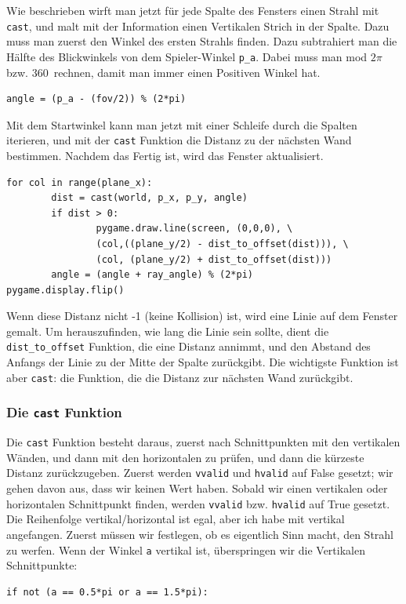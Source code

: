 \documentclass[a4paper,12pt]{report}
\begin{document}
Wie beschrieben wirft man jetzt für jede Spalte des Fensters einen Strahl mit \texttt{cast}, und malt mit der Information einen Vertikalen Strich in der Spalte. Dazu muss man zuerst den Winkel des ersten Strahls finden. Dazu subtrahiert man die Hälfte des Blickwinkels von dem Spieler-Winkel \texttt{p\_a}. Dabei muss man mod $2\pi$ bzw. 360\textdegree\ rechnen, damit man immer einen Positiven Winkel hat.
\begin{Verbatim}[baselinestretch=1.0, xleftmargin=1cm]
angle = (p_a - (fov/2)) % (2*pi)
\end{Verbatim}

Mit dem Startwinkel kann man jetzt mit einer Schleife durch die Spalten iterieren, und mit der \texttt{cast} Funktion die Distanz zu der nächsten Wand bestimmen. Nachdem das Fertig ist, wird das Fenster aktualisiert.
\begin{Verbatim}[baselinestretch=1.0, xleftmargin=1cm]
for col in range(plane_x):
        dist = cast(world, p_x, p_y, angle)
        if dist > 0:
                pygame.draw.line(screen, (0,0,0), \
                (col,((plane_y/2) - dist_to_offset(dist))), \
                (col, (plane_y/2) + dist_to_offset(dist)))
        angle = (angle + ray_angle) % (2*pi)
pygame.display.flip()
\end{Verbatim}
Wenn diese Distanz nicht -1 (keine Kollision) ist, wird eine Linie auf dem Fenster gemalt. Um herauszufinden, wie lang die Linie sein sollte, dient die \texttt{dist\_to\_offset} Funktion, die eine Distanz annimmt, und den Abstand des Anfangs der Linie zu der Mitte der Spalte zurückgibt. Die wichtigste Funktion ist aber \texttt{cast}: die Funktion, die die Distanz zur nächsten Wand zurückgibt.

\subsubsection{Die \texttt{cast} Funktion}
Die \texttt{cast} Funktion besteht daraus, zuerst nach Schnittpunkten mit den vertikalen Wänden, und dann mit den horizontalen zu prüfen, und dann die kürzeste Distanz zurückzugeben. Zuerst werden \texttt{vvalid} und \texttt{hvalid} auf False gesetzt; wir gehen davon aus, dass wir keinen Wert haben. Sobald wir einen vertikalen oder horizontalen Schnittpunkt finden, werden \texttt{vvalid} bzw. \texttt{hvalid} auf True gesetzt. \\
Die Reihenfolge vertikal/horizontal ist egal, aber ich habe mit vertikal angefangen. Zuerst müssen wir festlegen, ob es eigentlich Sinn macht, den Strahl zu werfen. Wenn der Winkel \texttt{a} vertikal ist, überspringen wir die Vertikalen Schnittpunkte:
\begin{Verbatim}[baselinestretch=1.0, xleftmargin=1cm]
if not (a == 0.5*pi or a == 1.5*pi):
\end{Verbatim}
\end{document}
